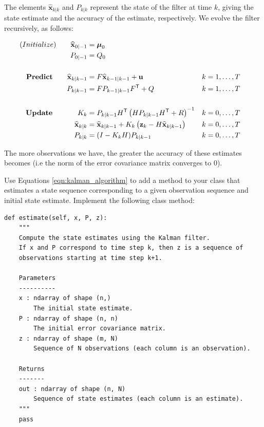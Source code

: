 The elements $\widehat{\mathbf{x}}_{k|k}$ and $P_{k|k}$ represent the state of the filter at time $k$, giving the state estimate and the accuracy of the estimate, respectively.
We evolve the filter recursively, as follows:

\begin{subequations}
\begin{align}
    (Initialize) \qquad \widehat{\mathbf{x}}_{0|-1} & = \boldsymbol \mu_0 \\
    \qquad P_{0|-1} & = Q_0 \\
    \vspace{0.2cm} \notag \\
    \textbf{Predict} \qquad \widehat{\mathbf{x}}_{k|k-1} & = F\widehat{\mathbf{x}}_{k-1|k-1} + \mathbf{u} && k = 1, \dots, T \\
    \qquad P_{k|k-1} & = FP_{k-1|k-1}F\trp + Q && k = 1,\dots, T \\
    \vspace{0.2cm} \notag \\
    \textbf{Update} \hspace{1.5em} \qquad K_{k} & = P_{k|k-1}H\trp \left(HP_{k|k-1}H\trp + R\right)^{-1}  && k = 0, \dots, T\\
    \qquad \widehat{\mathbf{x}}_{k|k} & = \widehat{\mathbf{x}}_{k|k-1} + K_{k}\left(\mathbf{z}_{k} - H\widehat{\mathbf{x}}_{k|k-1}\right) && k = 0, \dots, T \\
    \qquad P_{k|k} & = (I - K_{k}H)P_{k|k-1}  && k = 0, \dots, T
\end{align}
\label{eqn:kalman_algorithm}
\end{subequations}

The more observations we have, the greater the accuracy of these estimates becomes (i.e the norm of the error covariance matrix converges to 0).

\begin{problem}
Use Equations \eqref{eqn:kalman_algorithm} to add a method to your  class that estimates a state sequence corresponding to a given observation sequence and initial state estimate.
Implement the following class method:
\begin{lstlisting}
def estimate(self, x, P, z):
    """
    Compute the state estimates using the Kalman filter.
    If x and P correspond to time step k, then z is a sequence of
    observations starting at time step k+1.

    Parameters
    ----------
    x : ndarray of shape (n,)
        The initial state estimate.
    P : ndarray of shape (n, n)
        The initial error covariance matrix.
    z : ndarray of shape (m, N)
        Sequence of N observations (each column is an observation).

    Returns
    -------
    out : ndarray of shape (n, N)
        Sequence of state estimates (each column is an estimate).
    """
    pass
\end{lstlisting}
\end{problem}

